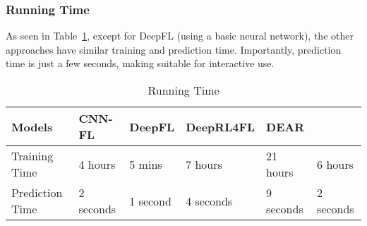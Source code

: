 
\subsubsection{Running Time}

As seen in Table~\ref{tab:time}, except for DeepFL (using a basic
neural network),
the other approaches have similar training and prediction
time. Importantly, prediction time is just a few seconds, making
{\tool} suitable for interactive use.



\begin{table}[t]
	\caption{Running Time}
	\vspace{-12pt}
	\begin{center}
        \tabcolsep 2pt
		\small
		\renewcommand{\arraystretch}{1} 
		\begin{tabular}{p{1.8cm}<{\centering}|p{1.1cm}<{\centering}|p{1cm}<{\centering}|p{1.2cm}<{\centering}|p{1.1cm}<{\centering}|p{1.1cm}<{\centering}}
			\hline
			Models          & CNN-FL & DeepFL & DeepRL4FL & DEAR & {\tool} \\\hline
			Training Time & 4 hours & 5 mins & 7 hours & 21 hours & 6 hours \\
			Prediction Time & 2 seconds & 1 second & 4 seconds &9 seconds & 2 seconds\\ 
			\hline
		\end{tabular}
		\label{tab:time}
	\end{center}
\vspace{-5pt}
\end{table}
